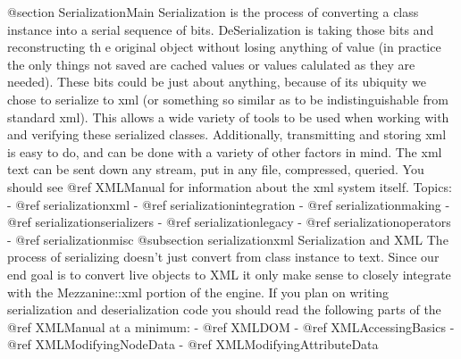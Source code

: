 \begin{DoxyVerb}   @section SerializationMain
   Serialization is the process of converting a class instance into a serial sequence of bits. DeSerialization is taking those
   bits and reconstructing th e original object without losing anything of value (in practice the only things not saved are cached
   values or values calulated as they are needed). These bits could be just about anything, because of its ubiquity we chose
   to serialize to xml (or something so similar as to be indistinguishable from standard xml). This allows a wide variety of tools
   to be used when working with and verifying these serialized classes. Additionally, transmitting and storing xml is easy to do,
   and can be done with a variety of other factors in mind. The xml text can be sent down any stream, put in any file, compressed,
   queried. You should see @ref XMLManual for information about the xml system itself.
   \n \n
   Topics:
       - @ref serializationxml
       - @ref serializationintegration
           - @ref serializationmaking
           - @ref serializationserializers
           - @ref serializationlegacy
       - @ref serializationoperators
       - @ref serializationmisc
   @subsection serializationxml Serialization and XML
   The process of serializing doesn't just convert from class instance to text. Since our end goal is to convert live objects to
   XML it only make sense to closely integrate with the Mezzanine::xml portion of the engine. If you plan on writing serialization
   and deserialization code you should read the following parts of the @ref XMLManual at a minimum:
       - @ref XMLDOM
       - @ref XMLAccessingBasics
       - @ref XMLModifyingNodeData
       - @ref XMLModifyingAttributeData


\end{DoxyVerb}
